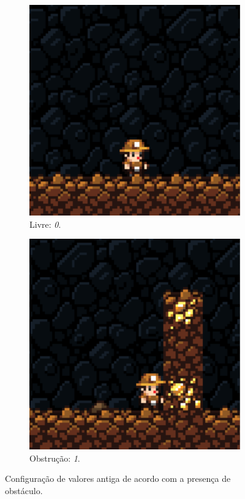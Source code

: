 \begin{figure}[H]
\centering
	\begin{subfigure}[b]{0.2\textwidth}
        \includegraphics[width=\textwidth]{fig/obstacle-3.pdf}
        \caption{Livre: \textit{0}.}
	\end{subfigure}
	\begin{subfigure}[b]{0.2\textwidth}
        \includegraphics[width=\textwidth]{fig/obstacle.pdf}
        \caption{Obstrução: \textit{1}.}
	\end{subfigure}
	\caption{Configuração de valores antiga de acordo com a presença de
	obstáculo.}
	\label{fig:obstacle-input-wrong}
\end{figure}

